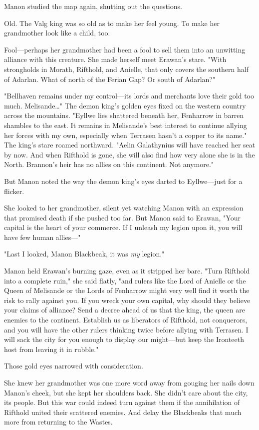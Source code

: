 Manon studied the map again, shutting out the questions.

Old.
The Valg king was so old as to make her feel young.
To make her grandmother look like a child, too.

Fool---perhaps her grandmother had been a fool to sell them into an unwitting alliance with this creature.
She made herself meet Erawan's stare.
"With strongholds in Morath, Rifthold, and Anielle, that only covers the southern half of Adarlan.
What of north of the Ferian Gap?
Or south of Adarlan?"

"Bellhaven remains under my control---its lords and merchants love their gold too much.
Melisande\ldots" The demon king's golden eyes fixed on the western country across the mountains.
"Eyllwe lies shattered beneath her, Fenharrow in barren shambles to the east.
It remains in Melisande's best interest to continue allying her forces with my own, especially when Terrasen hasn't a copper to its name."
The king's stare roamed northward.
"Aelin Galathynius will have reached her seat by now.
And when Rifthold is gone, she will also find how very alone she is in the North.
Brannon's heir has no allies on this continent.
Not anymore."

But Manon noted the way the demon king's eyes darted to Eyllwe---just for a flicker.

She looked to her grandmother, silent yet watching Manon with an expression that promised death if she pushed too far.
But Manon said to Erawan, "Your capital is the heart of your commerce.
If I unleash my legion upon it, you will have few human allies---"

"Last I looked, Manon Blackbeak, it was \emph{my} legion."

Manon held Erawan's burning gaze, even as it stripped her bare.
"Turn Rifthold into a complete ruin," she said flatly, "and rulers like the Lord of Anielle or the Queen of Melisande or the Lords of Fenharrow might very well find it worth the risk to rally against you.
If you wreck your own capital, why should they believe your claims of alliance?
Send a decree ahead of us that the king, the queen are enemies to the continent.
Establish us as liberators of Rifthold, not conquerors, and you will have the other rulers thinking twice before allying with Terrasen.
I will sack the city for you enough to display our might---but keep the Ironteeth host from leaving it in rubble."


Those gold eyes narrowed with consideration.

She knew her grandmother was one more word away from gouging her nails down Manon's cheek, but she kept her shoulders back.
She didn't care about the city, its people.
But this war could indeed turn against them if the annihilation of Rifthold united their scattered enemies.
And delay the Blackbeaks that much more from returning to the Wastes.

